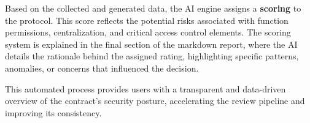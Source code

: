 \documentclass[paper=a4, fontsize=11pt,twoside]{scrartcl}
\begin{document}
Based on the collected and generated data, the AI engine assigns a \textbf{scoring} to the protocol. This score reflects the potential risks associated with function permissions, centralization, and critical access control elements. The scoring system is explained in the final section of the markdown report, where the AI details the rationale behind the assigned rating, highlighting specific patterns, anomalies, or concerns that influenced the decision.

This automated process provides users with a transparent and data-driven overview of the contract's security posture, accelerating the review pipeline and improving its consistency.
\end{document}

